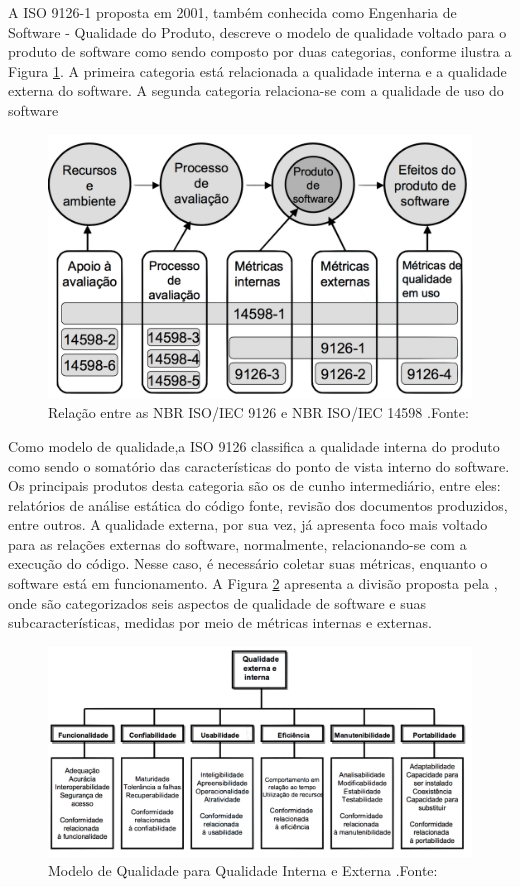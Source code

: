  A ISO 9126-1 proposta em 2001, também conhecida como Engenharia de Software - Qualidade do Produto, descreve o modelo de qualidade voltado para o produto de software como sendo composto por duas categorias, conforme ilustra a Figura \ref{img:relacao_iso}. A primeira categoria está relacionada a qualidade interna e a qualidade externa do software. A segunda categoria relaciona-se com a qualidade de uso do software \cite{_nbr_2016}
\graphicspath{{figuras/}}
\begin{figure}[h]
\centering
\includegraphics[scale=0.40]{ISO}
\caption{Relação entre as NBR ISO/IEC 9126 e NBR ISO/IEC 14598 .Fonte:\cite{_nbr_2016}}
\label{img:relacao_iso}
\end{figure}

 Como modelo de qualidade,a ISO 9126 classifica a qualidade interna do produto como sendo o somatório das características do ponto de vista interno do software. Os principais produtos desta categoria são os de cunho intermediário, entre eles: relatórios de análise estática do código fonte, revisão dos documentos produzidos, entre outros. A qualidade externa, por sua vez, já apresenta foco mais voltado para as relações externas do software, normalmente, relacionando-se com a execução do código. Nesse caso, é necessário coletar suas métricas, enquanto o software está em funcionamento. A Figura \ref{img:modelo_qualidade} apresenta a divisão proposta pela \cite{_nbr_2016}, onde são categorizados seis aspectos de qualidade de software e suas subcaracterísticas, medidas por meio de métricas internas e externas. 
\graphicspath{{figuras/}}
\begin{figure}[h]
\centering
\includegraphics[scale=0.50]{Modelo_de_Qualidade}
\caption{Modelo de Qualidade para Qualidade Interna e Externa .Fonte:\cite{_nbr_2016}}
\label{img:modelo_qualidade}
\end{figure}

